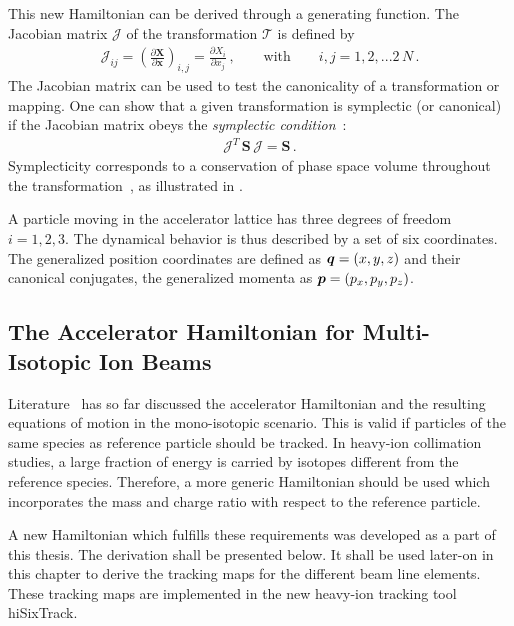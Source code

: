 This new Hamiltonian can be derived through a generating function. The Jacobian matrix $\mathcal{J}$ of the transformation $\mathcal{T}$ is defined by~\cite{CERN-SL-95-12} 
\begin{align}
\mathcal{J}_{ij} = \left( \frac{\partial \mathbf{X}}{\partial \mathbf{x}} \right)_{i,j} = \frac{\partial X_i}{\partial x_j} \, , \quad \quad \text{with} \quad \quad i,j=1,2,...2\,N \, .
\end{align}
The Jacobian matrix can be used to test the canonicality of a transformation or mapping.
\newpage
One can show that a given transformation is symplectic (or canonical) if the Jacobian matrix obeys the \emph{symplectic condition}~\cite{CERN-SL-95-12}:
\begin{align}
\mathcal{J}^T \, \mathbf{S} \, \mathcal{J} =  \mathbf{S} \, . \label{sympl:condition}
\end{align} 
Symplecticity corresponds to a conservation of phase space volume throughout the transformation~\cite{wolski2014beam}, as illustrated in . 



A particle moving in the accelerator lattice has three degrees of freedom $i=1,2,3$. The dynamical behavior is thus described by a set of six coordinates. The generalized position coordinates are defined as \mbox{$\boldsymbol{q} = (x,y,z)$} and their canonical conjugates, the generalized momenta as \mbox{$\boldsymbol{p} = (p_x,p_y,p_z)$}.


\subsection{The Accelerator Hamiltonian for Multi-Isotopic Ion Beams}

Literature~\cite{DESY-85-084,DESY-87-036,CERN-SL-95-12,DESY-95-189,wolski2014beam} has so far discussed the accelerator Hamiltonian and the resulting equations of motion in the mono-isotopic scenario. This is valid if particles of the same species as reference particle should be tracked. In heavy-ion collimation studies, a large fraction of energy is carried by isotopes different from the reference species. Therefore, a more generic Hamiltonian should be used which incorporates the mass and charge ratio with respect to the reference particle. 

A new Hamiltonian which fulfills these requirements was developed as a part of this thesis. The derivation shall be presented below. It shall be used later-on in this chapter to derive the tracking maps for the different beam line elements. These tracking maps are implemented in the new heavy-ion tracking tool hiSixTrack.
\newpage


